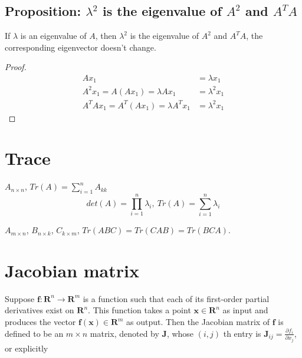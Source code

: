 \documentclass[11pt]{elegantbook}
\begin{document}
\subsection{Proposition: $\lambda^2$ is the eigenvalue of $A^2$ and $A^TA$}
\begin{proposition}
If $\lambda$ is an eigenvalue of $A$, then $\lambda^2$ is the eigenvalue of $A^2$ and $ A^TA$, the corresponding eigenvector doesn't change.
\end{proposition}
\begin{proof}
\begin{equation}
    \begin{aligned}
        Ax_1&=\lambda x_1\\
        A^2x_1=A(Ax_1)=\lambda Ax_1&=\lambda^2 x_1\\
        A^TAx_1=A^T(Ax_1)=\lambda A^Tx_1&=\lambda^2x_1
    \end{aligned}
    \nonumber
\end{equation}
\end{proof}

\section{Trace}
$A_{n\times n}$, $Tr(A)=\sum_{i=1}^nA_{kk}$
$$det(A)=\prod_{i=1}^n\lambda_i,\ Tr(A)=\sum_{i=1}^n\lambda_i$$
\begin{proposition}
$A_{m\times n}$, $B_{n\times k}$, $C_{k\times m}$, $Tr(ABC)=Tr(CAB)=Tr(BCA)$.
\end{proposition}






\section{Jacobian matrix}
Suppose $\mathbf{f}: \mathbf{R}^{n} \rightarrow \mathbf{R}^{m}$ is a function such that each of its first-order partial derivatives exist on $\mathbf{R}^{n}.$ This function takes a point $\mathbf{x} \in \mathbf{R}^{n}$ as input and produces the vector $\mathbf{f}(\mathbf{x}) \in \mathbf{R}^{m}$ as output. Then the Jacobian matrix of $\mathbf{f}$ is defined to be an $m \times n$ matrix, denoted by $\mathbf{J}$, whose $(i, j)$ th entry is $\mathbf{J}_{i j}=\frac{\partial f_{i}}{\partial x_{j}}$, or explicitly
\end{document}
